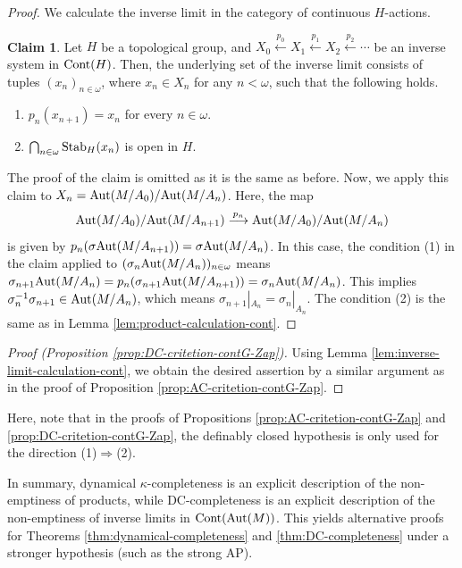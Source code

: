 \documentclass[10pt]{amsart}
\numberwithin{equation}{section}
\theoremstyle{plain}
\theoremstyle{definition}
\newtheorem*{claim}{Claim}
\newcommand{\om}{\omega}
\newcommand{\edge}[1]{\overset{#1}{\longrightarrow}}
\newcommand{\leftedge}[1]{\overset{#1}{\longleftarrow}}
\begin{document}
\begin{proof}
We calculate the inverse limit in the category of continuous $H$-actions.

%

%
\begin{claim}
Let $H$ be a topological group, and $X_0\leftedge{p_0}X_1\leftedge{p_1}X_2\leftedge{p_2}\cdots$ be an inverse system in ${\rm Cont}(H)$.
Then, the underlying set of the inverse limit consists of tuples $(x_n)_{n\in\om}$, where $x_n\in X_n$ for any $n<\om$, such that the following holds.
\begin{enumerate}
\item $p_n(x_{n+1})=x_n$ for every $n\in\om$.
\item $\bigcap_{n\in\om}{\rm Stab}_{H}(x_n)$ is open in $H$.
\end{enumerate}
\end{claim}

The proof of the claim is omitted as it is the same as before.
Now, we apply this claim to $X_n={\rm Aut}(M/{A_0})/{\rm Aut}(M/{A_n})$.
Here, the map 
\[{\rm Aut}(M/{A_0})/{\rm Aut}(M/{A_{n+1}})\edge{p_n} {\rm Aut}(M/{A_0})/{\rm Aut}(M/{A_n})\]
is given by $p_n(\sigma {\rm Aut}(M/{A_{n+1}}))=\sigma {\rm Aut}(M/{A_n})$.
In this case, the condition (1) in the claim applied to $(\sigma_n {\rm Aut}(M/{A_n}))_{n\in\om}$ means $\sigma_{n+1}{\rm Aut}(M/{A_n})=p_n(\sigma_{n+1}{\rm Aut}(M/{A_{n+1}}))=\sigma_n {\rm Aut}(M/{A_n})$.
This implies $\sigma_n^{-1}\sigma_{n+1}\in {\rm Aut}(M/{A_n})$, which means $\sigma_{n+1}|_{A_n}=\sigma_n|_{A_n}$.
The condition (2) is the same as in Lemma \ref{lem:product-calculation-cont}.
\end{proof}

\begin{proof}[Proof (Proposition \ref{prop:DC-critetion-contG-Zap})]
Using Lemma \ref{lem:inverse-limit-calculation-cont}, we obtain the desired assertion by a similar argument as in the proof of Proposition \ref{prop:AC-critetion-contG-Zap}.
\end{proof}

Here, note that in the proofs of Propositions \ref{prop:AC-critetion-contG-Zap} and \ref{prop:DC-critetion-contG-Zap}, the definably closed hypothesis is only used for the direction (1)$\Rightarrow$(2).


In summary, dynamical $\kappa$-completeness is an explicit description of the non-emptiness of products, while DC-completeness is an explicit description of the non-emptiness of inverse limits in ${\rm Cont}({\rm Aut}(M))$.
This yields alternative proofs for Theorems \ref{thm:dynamical-completeness} and \ref{thm:DC-completeness} under a stronger hypothesis (such as the strong AP).
\end{document}
